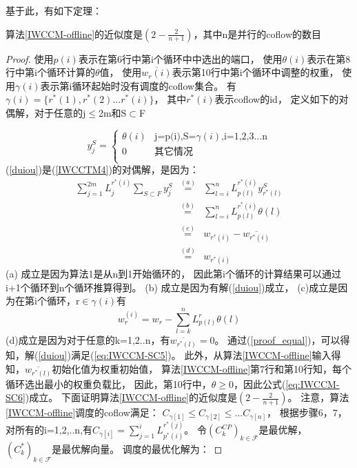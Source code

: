 基于此，有如下定理：

 \begin{theorem}\label{IWCCTM5}
 算法\ref{IWCCM-offline}的近似度是$(2-\frac{2}{n+1})$，其中n是并行的coflow的数目
 \end{theorem}

\begin{proof}
使用$p(i)$表示在第6行中第i个循环中中选出的端口，
使用$\theta(i)$表示在第8行中第i个循环计算的$\theta$值，
使用$\overline{w_r(i)}$表示第10行中第i个循环中调整的权重，
使用$\gamma(i)$表示第i循环起始时没有调度的coflow集合。
有$\gamma(i)=\{r^*(1),r^*(2)...r^*(i)\}$，
其中$r^*(i)$表示coflow的id，
定义如下的对偶解，对于任意的j$\leq $2m和S$\subset$F

\begin{equation}
\label{duiou}
 y_j^S=\left\{
\begin{array}{rcl}
\theta(i) &\text{j=p(i),S=$\gamma(i)$,i=1,2,3...n}\\
0 &\text{其它情况}\\
\end{array} \right. 
\end{equation}
(\ref{duiou})是(\ref{IWCCTM4})的对偶解，是因为：
\begin{eqnarray}\label{proof_equal}
\sum_{j=1}^{2m} L_{j}^{r^*(i)} \sum_{S\subset F} y_j^S
&\overset{(a)}{=}&\sum_{l=i}^{n}  L_{p(l)}^{r^*(i)} y_{r^*(l)}^S\nonumber \\
&\overset{(b)}{=}&\sum_{l=i}^{n}  L_{p(l)}^{r^*(i)} \theta(l)\nonumber \\
&\overset{(c)}{=}& w_{r^*(i)}-\overline{w_{r^*(i)}}\nonumber \\
&\overset{(d)}{=}&w_{r^*(i)}
\end{eqnarray}
(a) 成立是因为算法1是从n到1开始循环的， 因此第i个循环的计算结果可以通过i+1个循环到n个循环推算得到。
(b) 成立是因为有解(\ref{duiou})成立，
(c)成立是因为在第i个循环，r$\in \gamma(i)$有 
\begin{equation}
w_r^{(i)}=w_r-\sum_{l=k}^{n}L_{p(l)}^r\theta(l)
\end{equation}
(d)成立是因为对于任意的k=1,2..n，有$\overline{w_{r^*(l)}}=0$。
通过(\ref{proof_equal})，可以得知，解(\ref{duiou})满足(\ref{eq:IWCCM-SC5})。
此外，从算法\ref{IWCCM-offline}输入得知，$\overline{w_{r^*(l)}}$初始化值为权重初始值，
算法\ref{IWCCM-offline}第7行和第10行知，每个循环选出最小的权重负载比，
因此，第10行中，$\theta \geq 0$，因此公式(\ref{eq:IWCCM-SC6})成立。
下面证明算法\ref{IWCCM-offline}的近似度是$(2-\frac{2}{n+1})$。
注意，算法\ref{IWCCM-offline}调度的coflow满足：
$C_{\gamma[1]} \leq C_{\gamma[2]} \leq... C_{\gamma[n]}$，
根据步骤6，7，对所有的i=1,2,..n,有$C_{\gamma[i]}=\sum_{j=1}^i L_{p^*(i)}^{r^*(j)}$。
令$(C_k^{CP})_{k \in \mathcal{F}}$是最优解，$(C_k^{*})_{k \in \mathcal{F}}$是最优解向量。
调度的最优化解为：



\end{proof}

